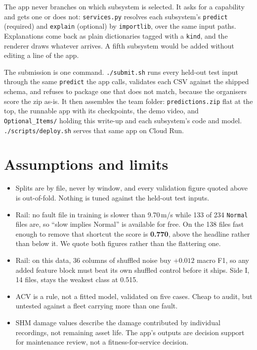 \documentclass[11pt,a4paper]{article}
\begin{document}
The app never branches on which subsystem is selected. It asks for a capability and gets one or
does not: \texttt{services.py} resolves each subsystem's \texttt{predict} (required) and
\texttt{explain} (optional) by \texttt{importlib}, over the same input paths. Explanations come back
as plain dictionaries tagged with a \texttt{kind}, and the renderer draws whatever arrives. A fifth
subsystem would be added without editing a line of the app.

The submission is one command. \texttt{./submit.sh} runs every held-out test input through the
same \texttt{predict} the app calls, validates each CSV against the shipped schema, and refuses to
package one that does not match, because the organisers score the zip as-is. It then assembles the
team folder: \texttt{predictions.zip} flat at the top, the runnable app with its checkpoints, the
demo video, and \texttt{Optional\_Items/} holding this write-up and each subsystem's code and
model. \texttt{./scripts/deploy.sh} serves that same app on Cloud Run.

\section{Assumptions and limits}

\begin{itemize}
  \item Splits are by file, never by window, and every validation figure quoted above is
        out-of-fold. Nothing is tuned against the held-out test inputs.
  \item Rail: no fault file in training is slower than 9.70\,m/s while 133 of 234 \texttt{Normal}
        files are, so ``slow implies Normal'' is available for free. On the 138 files fast enough
        to remove that shortcut the score is \textbf{0.770}, above the headline rather than below
        it. We quote both figures rather than the flattering one.
  \item Rail: on this data, 36 columns of shuffled noise buy $+0.012$ macro F1, so any added
        feature block must beat its own shuffled control before it ships. Side I, 14 files, stays
        the weakest class at 0.515.
  \item ACV is a rule, not a fitted model, validated on five cases. Cheap to audit, but untested
        against a fleet carrying more than one fault.
  \item SHM damage values describe the damage contributed by individual recordings, not remaining
        asset life. The app's outputs are decision support for maintenance review, not a
        fitness-for-service decision.
\end{itemize}
\end{document}

